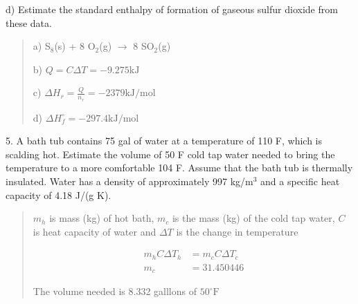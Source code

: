 \documentclass[11pt]{article}
\begin{document}
d) Estimate the standard enthalpy of formation of gaseous sulfur dioxide from these data.

\begin{quote}
  {\color{blue}
    a) S$_8$(s) + 8 O$_2$(g) $\rightarrow$ 8 SO$_2$(g)

    b) $Q = C\Delta T = -9.275\text{kJ}$

    c) $\Delta H_r = \frac{Q}{n_r} = -2379\text{kJ/mol}$

    d) $\Delta H^\circ_f = -297.4\text{kJ/mol}$
  }
\end{quote}

5. A bath tub contains 75 gal of water at a temperature of 110 F, which is scalding hot.
Estimate the volume of 50 F cold tap water needed to bring the temperature to a more
comfortable 104 F. Assume that the bath tub is thermally insulated. Water has a density
of approximately 997 kg/m$^3$ and a specific heat capacity of 4.18 J/(g K).

\begin{quote}
  {\color{blue} $m_h$ is mass (kg) of hot bath, $m_c$ is the mass (kg) of the cold tap
    water, $C$ is heat capacity of water and $\Delta T$ is the change in temperature

    \begin{align}
      m_h C \Delta T_h & = m_c C \Delta T_c \\
      m_c & = 31.450446
    \end{align}

    The volume needed is 8.332 galllons of $50^\circ\text{F}$
  }
\end{quote}

\pagebreak
\end{document}
